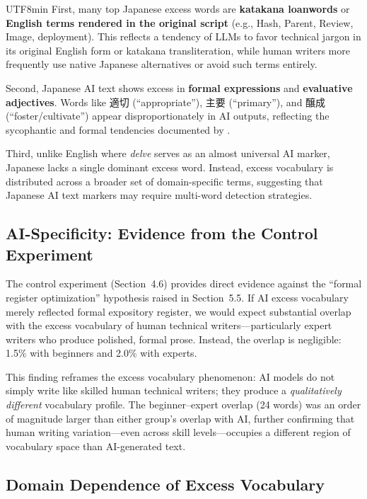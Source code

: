 \documentclass[11pt,a4paper]{article}
\begin{document}
\begin{CJK}{UTF8}{min}
First, many top Japanese excess words are \textbf{katakana loanwords} or \textbf{English terms rendered in the original script} (e.g., Hash, Parent, Review, Image, deployment). This reflects a tendency of LLMs to favor technical jargon in its original English form or katakana transliteration, while human writers more frequently use native Japanese alternatives or avoid such terms entirely.

Second, Japanese AI text shows excess in \textbf{formal expressions} and \textbf{evaluative adjectives}. Words like 適切 (``appropriate''), 主要 (``primary''), and 醸成 (``foster/cultivate'') appear disproportionately in AI outputs, reflecting the sycophantic and formal tendencies documented by \citet{malmqvist2024sycophancy}.

Third, unlike English where \textit{delve} serves as an almost universal AI marker, Japanese lacks a single dominant excess word. Instead, excess vocabulary is distributed across a broader set of domain-specific terms, suggesting that Japanese AI text markers may require multi-word detection strategies.

\subsection{AI-Specificity: Evidence from the Control Experiment}

The control experiment (Section~4.6) provides direct evidence against the ``formal register optimization'' hypothesis raised in Section~5.5. If AI excess vocabulary merely reflected formal expository register, we would expect substantial overlap with the excess vocabulary of human technical writers---particularly expert writers who produce polished, formal prose. Instead, the overlap is negligible: 1.5\% with beginners and 2.0\% with experts.

This finding reframes the excess vocabulary phenomenon: AI models do not simply write like skilled human technical writers; they produce a \emph{qualitatively different} vocabulary profile. The beginner--expert overlap (24 words) was an order of magnitude larger than either group's overlap with AI, further confirming that human writing variation---even across skill levels---occupies a different region of vocabulary space than AI-generated text.

\subsection{Domain Dependence of Excess Vocabulary}


\end{CJK}
\end{document}
